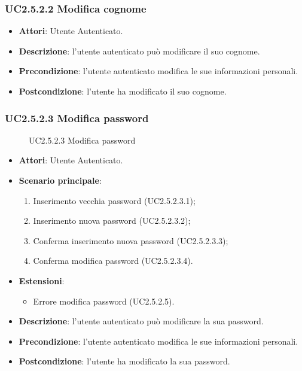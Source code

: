 \subsubsection{UC2.5.2.2 Modifica cognome}
\begin{itemize}
\item \textbf{Attori}: Utente Autenticato.
\item \textbf{Descrizione}: l'utente autenticato può modificare il suo cognome.
\item \textbf{Precondizione}: l'utente autenticato modifica le sue informazioni personali.
\item \textbf{Postcondizione}: l'utente ha modificato il suo cognome.
\end{itemize}
\subsubsection{UC2.5.2.3 Modifica password}
\begin{figure}[H]
\centering
\noindent{}
\caption{UC2.5.2.3 Modifica password}
\end{figure}
\begin{itemize}
\item \textbf{Attori}: Utente Autenticato.
\item \textbf{Scenario principale}:
\begin{enumerate}
\item Inserimento vecchia password (UC2.5.2.3.1);
\item Inserimento nuova password (UC2.5.2.3.2);
\item Conferma inserimento nuova password (UC2.5.2.3.3);
\item Conferma modifica password (UC2.5.2.3.4).
\end{enumerate}
\item \textbf{Estensioni}:
\begin{itemize}
\item Errore modifica password (UC2.5.2.5).
\end{itemize}
\item \textbf{Descrizione}: l'utente autenticato può modificare la sua password.
\item \textbf{Precondizione}: l'utente autenticato modifica le sue informazioni personali.
\item \textbf{Postcondizione}: l'utente ha modificato la sua password.
\end{itemize}
